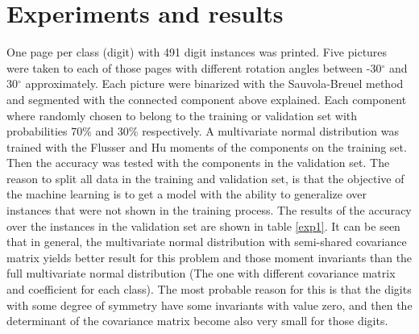 \documentclass[10pt,journal]{IEEEtran}
\begin{document}
	\section{Experiments and results}
	One page per class (digit) with 491 digit instances was printed. Five pictures were taken to
	each of those pages with different rotation angles between -30$^{\circ}$ and 30$^{\circ}$ 
	approximately. Each picture were binarized with the Sauvola-Breuel method and segmented with
	the connected component above explained. Each component where randomly chosen to belong to 
	the training or validation set with probabilities 70\% and 30\% respectively.\newline
	A multivariate normal distribution was trained with the
	Flusser and Hu moments of the components on the training set. Then the accuracy was tested
	with the components in the validation set. The reason to split all data in the training and
	validation set, is that the objective of the machine learning is to get a model with the 
	ability to generalize over instances that were not shown in the training process.\newline
	The results of the accuracy over the instances in the validation set are shown in table 
	\ref{exp1}. It can be seen that in general, the multivariate normal distribution with
	semi-shared covariance matrix yields better result for this problem and those moment invariants
	than the full multivariate normal distribution (The one with different covariance matrix 
	and coefficient	for each class). The most probable reason for this is that the digits with
	some degree of symmetry have some invariants with value zero, and then the determinant of
	the covariance matrix become also very small for those digits.\newline
	
\end{document}
